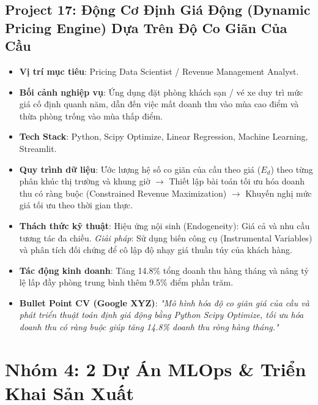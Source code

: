 \subsection{Project 17: Động Cơ Định Giá Động (Dynamic Pricing Engine) Dựa Trên Độ Co Giãn Của Cầu}
\begin{itemize}
    \item \textbf{Vị trí mục tiêu}: Pricing Data Scientist / Revenue Management Analyst.
    \item \textbf{Bối cảnh nghiệp vụ}: Ứng dụng đặt phòng khách sạn / vé xe duy trì mức giá cố định quanh năm, dẫn đến việc mất doanh thu vào mùa cao điểm và thừa phòng trống vào mùa thấp điểm.
    \item \textbf{Tech Stack}: Python, Scipy Optimize, Linear Regression, Machine Learning, Streamlit.
    \item \textbf{Quy trình dữ liệu}: Ước lượng hệ số co giãn của cầu theo giá ($E_d$) theo từng phân khúc thị trường và khung giờ $\rightarrow$ Thiết lập bài toán tối ưu hóa doanh thu có ràng buộc (Constrained Revenue Maximization) $\rightarrow$ Khuyến nghị mức giá tối ưu theo thời gian thực.
    \item \textbf{Thách thức kỹ thuật}: Hiệu ứng nội sinh (Endogeneity): Giá cả và nhu cầu tương tác đa chiều. \textit{Giải pháp}: Sử dụng biến công cụ (Instrumental Variables) và phân tích đối chứng để cô lập độ nhạy giá thuần túy của khách hàng.
    \item \textbf{Tác động kinh doanh}: Tăng 14.8\% tổng doanh thu hàng tháng và nâng tỷ lệ lấp đầy phòng trung bình thêm 9.5\% điểm phần trăm.
    \item \textbf{Bullet Point CV (Google XYZ)}: \textit{"Mô hình hóa độ co giãn giá của cầu và phát triển thuật toán định giá động bằng Python Scipy Optimize, tối ưu hóa doanh thu có ràng buộc giúp tăng 14.8\% doanh thu ròng hàng tháng."}
\end{itemize}

\section{Nhóm 4: 2 Dự Án MLOps \& Triển Khai Sản Xuất}

